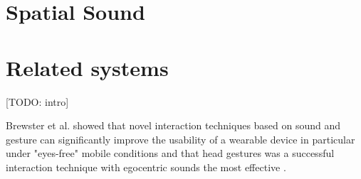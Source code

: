 



\section{Spatial Sound}







\section{Related systems}
[TODO: intro]

Brewster et al. showed that novel interaction techniques based on sound and gesture can significantly improve the usability of a wearable device in particular under "eyes-free" mobile conditions and that head gestures was a successful interaction technique with egocentric sounds the most effective \cite{brewster_multimodaleyes-freeinteraction_2003}.

